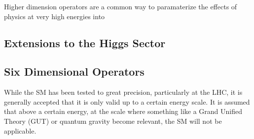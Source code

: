 Higher dimension operators are a common way to paramaterize the effects of physics at very high energies into

\subsection{Extensions to the Higgs Sector}
\label{sec:higgsExt}


\subsection{Six Dimensional Operators}
\label{sec:dim6}

While the SM has been tested to great precision, particularly at the LHC, it is generally accepted that it is only valid up to a certain energy scale. It is assumed that above a certain energy, at the scale where something like a Grand Unified Theory (GUT) or quantum gravity become relevant, the SM will not be applicable. 
